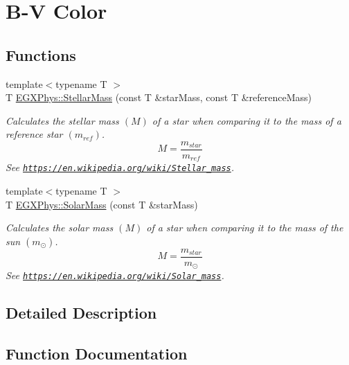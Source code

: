 \hypertarget{group___e_g_x_phys-_b_v_color}{}\section{B-\/V Color}
\label{group___e_g_x_phys-_b_v_color}
\subsection*{Functions}
\begin{DoxyCompactItemize}
\item 
{\footnotesize template$<$typename T $>$ }\\T \mbox{\hyperlink{group___e_g_x_phys-_b_v_color_gabbd6081cd3bfb0153d7470d58f733a61}{E\+G\+X\+Phys\+::\+Stellar\+Mass}} (const T \&star\+Mass, const T \&reference\+Mass)
\begin{DoxyCompactList}\small\item\em Calculates the stellar mass $(M)$ of a star when comparing it to the mass of a reference star $(m_{ref})$. \[M=\frac{m_{star}}{m_{ref}}\] See \href{https://en.wikipedia.org/wiki/Stellar_mass}{\tt https\+://en.\+wikipedia.\+org/wiki/\+Stellar\+\_\+mass}. \end{DoxyCompactList}\item 
{\footnotesize template$<$typename T $>$ }\\T \mbox{\hyperlink{group___e_g_x_phys-_b_v_color_gac393d64d586be3dc76ac7a98ac336514}{E\+G\+X\+Phys\+::\+Solar\+Mass}} (const T \&star\+Mass)
\begin{DoxyCompactList}\small\item\em Calculates the solar mass $(M)$ of a star when comparing it to the mass of the sun $(m_\odot)$. \[M=\frac{m_{star}}{m_\odot}\] See \href{https://en.wikipedia.org/wiki/Solar_mass}{\tt https\+://en.\+wikipedia.\+org/wiki/\+Solar\+\_\+mass}. \end{DoxyCompactList}\end{DoxyCompactItemize}


\subsection{Detailed Description}


\subsection{Function Documentation}
\mbox{\label{group___e_g_x_phys-_b_v_color_gac393d64d586be3dc76ac7a98ac336514}} 
